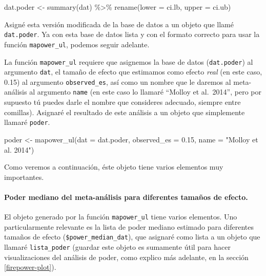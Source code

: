 \documentclass[
  bookmarksnumbered]{article}
\newenvironment{Shaded}{\begin{snugshade}}{\end{snugshade}}
\newcommand{\AttributeTok}[1]{\textcolor[rgb]{0.00,0.34,0.68}{#1}}
\newcommand{\FloatTok}[1]{\textcolor[rgb]{0.69,0.50,0.00}{#1}}
\newcommand{\FunctionTok}[1]{\textcolor[rgb]{0.39,0.29,0.61}{#1}}
\newcommand{\NormalTok}[1]{\textcolor[rgb]{0.12,0.11,0.11}{#1}}
\newcommand{\OtherTok}[1]{\textcolor[rgb]{0.00,0.43,0.16}{#1}}
\newcommand{\SpecialCharTok}[1]{\textcolor[rgb]{0.24,0.68,0.91}{#1}}
\newcommand{\StringTok}[1]{\textcolor[rgb]{0.75,0.01,0.01}{#1}}
\begin{document}
\begin{Shaded}
\begin{Highlighting}[]
\NormalTok{dat.poder }\OtherTok{\textless{}{-}} \FunctionTok{summary}\NormalTok{(dat) }\SpecialCharTok{\%\textgreater{}\%}
  \FunctionTok{rename}\NormalTok{(}\AttributeTok{lower =}\NormalTok{ ci.lb, }\AttributeTok{upper =}\NormalTok{ ci.ub)}
\end{Highlighting}
\end{Shaded}

Asigné esta versión modificada de la base de datos a un objeto que llamé \texttt{dat.poder}. Ya con esta base de datos lista y con el formato correcto para usar la función \texttt{mapower\_ul}, podemos seguir adelante.

La función \texttt{mapower\_ul} requiere que asignemos la base de datos (\texttt{dat.poder}) al argumento \texttt{dat}, el tamaño de efecto que estimamos como efecto \emph{real} (en este caso, 0.15) al argumento \texttt{observed\_es}, así como un nombre que le daremos al meta-análisis al argumento \texttt{name} (en este caso lo llamaré ``Molloy et al.~2014'', pero por supuesto tú puedes darle el nombre que consideres adecuado, siempre entre comillas). Asignaré el resultado de este análisis a un objeto que simplemente llamaré \texttt{poder}.

\begin{Shaded}
\begin{Highlighting}[]
\NormalTok{poder }\OtherTok{\textless{}{-}} \FunctionTok{mapower\_ul}\NormalTok{(}\AttributeTok{dat =}\NormalTok{ dat.poder, }\AttributeTok{observed\_es =} \FloatTok{0.15}\NormalTok{, }\AttributeTok{name =} \StringTok{"Molloy et al. 2014"}\NormalTok{)}
\end{Highlighting}
\end{Shaded}

Como veremos a continuación, éste objeto tiene varios elementos muy importantes.

\hypertarget{poder-mediano}{%
\paragraph{Poder mediano del meta-análisis para diferentes tamaños de efecto.}\label{poder-mediano}}

El objeto generado por la función \texttt{mapower\_ul} tiene varios elementos. Uno particularmente relevante es la lista de poder mediano estimado para diferentes tamaños de efecto (\texttt{\$power\_median\_dat}), que asignaré como lista a un objeto que llamaré \texttt{lista\_poder} (guardar este objeto es sumamente útil para hacer visualizaciones del análisis de poder, como explico más adelante, en la sección \ref{firepower-plot}).
\end{document}
